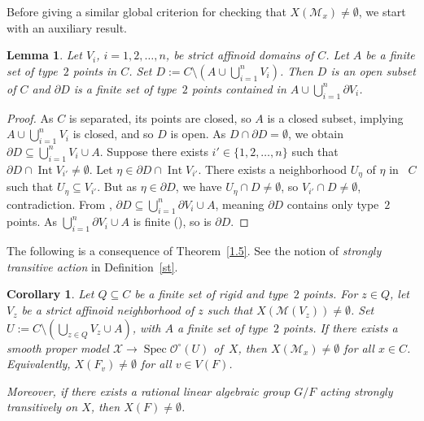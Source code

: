 \documentclass[JEP,XML,SOM,Unicode,NoFloatCountersInSection,published]{cedram}
\DeclareMathOperator{\Int}{Int}
\DeclareMathOperator{\Spec}{Spec}
\let\backslash\setminus
\newtheorem{lm}[thm]{Lemma}
\newtheorem{cor}[thm]{Corollary}
\theoremstyle{definition}
\begin{document}
Before giving a similar global criterion for checking that $X(\mathscr{M}_x) \neq \emptyset$, we start with an auxiliary result.\enlargethispage{.5\baselineskip}%

\begin{lm} \label{1.7.1}
Let $V_i$, $i=1,2,\dots, n$, be strict affinoid domains of $C$. Let $A$ be a finite set of type~$2$ points in $C$. Set $D:=C \backslash (A \cup \bigcup_{i=1}^n V_i)$. Then $D$ is an open subset of $C$ and $\partial{D}$ is a finite set of type~$2$ points contained in $A \cup \bigcup_{i=1}^n \partial{V_i}$.
\end{lm}
\begin{proof}
As $C$ is separated, its points are closed, so $A$ is a closed subset, implying $A \cup \bigcup_{i=1}^n V_i$ is closed, and so $D$ is open. As $D \cap \partial{D}=\emptyset$, we obtain $\partial{D} \subseteq \bigcup_{i=1}^n V_i \cup A$. Suppose there exists $i' \in \{1,2,\dots, n\}$ such that $\partial{D} \cap \Int V_{i'} \neq \emptyset$. Let $\eta \in \partial{D} \cap \Int V_{i'}$. There exists a neighborhood $U_{\eta}$ of $\eta$ in ~$C$ such that $U_{\eta} \subseteq V_{i'}$. But as $\eta \in \partial{D}$, we have $U_{\eta} \cap D \neq \emptyset$, so $V_{i'} \cap D \neq \emptyset$, contradiction. From \cite[Cor.\,1.8.11]{doktoratura}, $\partial{D} \subseteq \bigcup_{i=1}^n \partial{V_i} \cup A$, meaning $\partial{D}$ contains only type~$2$ points. As $ \bigcup_{i=1}^n \partial{V_i} \cup A$ is finite (\cf \cite[Prop.\,2.5]{une}), so is $\partial{D}$.
\end{proof}

The following is a consequence of Theorem~\ref{1.5}. See the notion of \emph{strongly transitive action} in Definition~\ref{st}.

\begin{cor} \label{1.7}
Let $Q \subseteq C$ be a finite set of rigid and type~$2$ points. For ${z \in Q}$, let $V_z$ be a strict affinoid neighborhood of $z$ such that $X(\mathscr{M}(V_z)) \neq \emptyset$.
Set ${U:=C \backslash (\bigcup_{z \in Q} V_z \cup A)}$, with $A$ a finite set of type~$2$ points. If there exists a smooth proper model ${\mathcal{X} \to \Spec \mathcal{O}^{\circ}(U)}$ of~$X$,
then $X(\mathscr{M}_x) \neq \emptyset$ for all $x \in C$. Equivalently, $X(F_v) \neq \emptyset$ for all $v \in V(F)$.

Moreover, if there exists a rational linear algebraic group $G/F$ acting strongly transitively on $X$, then $X(F) \neq \emptyset$.
\end{cor}
\end{document}

